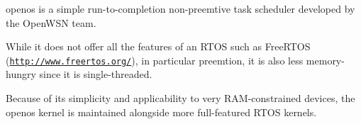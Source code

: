 {\ttfamily openos} is a simple run-\/to-\/completion non-\/preemtive task scheduler developed by the Open\+W\+SN team.

While it does not offer all the features of an R\+T\+OS such as Free\+R\+T\+OS (\href{http://www.freertos.org/}{\tt http\+://www.\+freertos.\+org/}), in particular preemtion, it is also less memory-\/hungry since it is single-\/threaded.

Because of its simplicity and applicability to very R\+A\+M-\/constrained devices, the openos kernel is maintained alongside more full-\/featured R\+T\+OS kernels. 